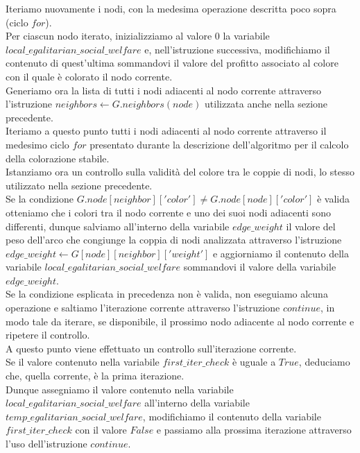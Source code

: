Iteriamo nuovamente i nodi, con la medesima operazione descritta poco sopra (ciclo $for$).\\
Per ciascun nodo iterato, inizializziamo al valore $0$ la variabile \\
$local\_egalitarian\_social\_welfare$ e, nell'istruzione successiva, modifichiamo il contenuto di quest'ultima sommandovi il valore del profitto associato al colore con il quale è colorato il nodo corrente.\\

Generiamo ora la lista di tutti i nodi adiacenti al nodo corrente attraverso l'istruzione $neighbors\gets G.neighbors(node)$ utilizzata anche nella sezione precedente.\\
Iteriamo a questo punto tutti i nodi adiacenti al nodo corrente attraverso il medesimo ciclo $for$ presentato durante la descrizione dell'algoritmo per il calcolo della colorazione stabile.\\

Istanziamo ora un controllo sulla validità del colore tra le coppie di nodi, lo stesso utilizzato nella sezione precedente.\\
Se la condizione $G.node[neighbor]['color'] \neq G.node[node]['color']$ è valida otteniamo che i colori tra il nodo corrente e uno dei suoi nodi adiacenti sono differenti, dunque salviamo all'interno della variabile $edge\_weight$ il valore del peso dell'arco che congiunge la coppia di nodi analizzata attraverso l'istruzione $edge\_weight\gets G[node][neighbor]['weight']$ e aggiorniamo il contenuto della variabile $local\_egalitarian\_social\_welfare$ sommandovi il valore della variabile $edge\_weight$.\\

Se la condizione esplicata in precedenza non è valida, non eseguiamo alcuna operazione e saltiamo l'iterazione corrente attraverso l'istruzione $continue$, in modo tale da iterare, se disponibile, il prossimo nodo adiacente al nodo corrente e ripetere il controllo.\\

A questo punto viene effettuato un controllo sull'iterazione corrente.\\
Se il valore contenuto nella variabile $first\_iter\_check$ è uguale a $True$, deduciamo che, quella corrente, è la prima iterazione.\\
Dunque assegniamo il valore contenuto nella variabile \\
$local\_egalitarian\_social\_welfare$ all'interno della variabile \\
$temp\_egalitarian\_social\_welfare$, modifichiamo il contenuto della variabile $first\_iter\_check$ con il valore $False$ e passiamo alla prossima iterazione attraverso l'uso dell'istruzione $continue$.\\

